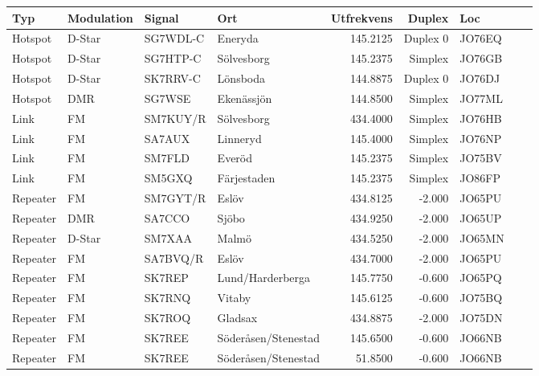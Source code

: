 \begin{longtable}{llllrrlcl}
	Typ      & Modulation      & Signal   & Ort                     & Utfrekvens &   Duplex & Loc    &  &  \\ \hline
	Hotspot  & D-Star          & SG7WDL-C & Eneryda                 &   145.2125 & Duplex 0 & JO76EQ &  \\
	Hotspot  & D-Star          & SG7HTP-C & Sölvesborg              &   145.2375 &  Simplex & JO76GB &  \\
	Hotspot  & D-Star          & SK7RRV-C & Lönsboda                &   144.8875 & Duplex 0 & JO76DJ &  \\
	Hotspot  & DMR             & SG7WSE   & Ekenässjön              &   144.8500 &  Simplex & JO77ML &  \\
	Link     & FM              & SM7KUY/R & Sölvesborg              &   434.4000 &  Simplex & JO76HB &  \\
	Link     & FM              & SA7AUX   & Linneryd                &   145.4000 &  Simplex & JO76NP &  \\
	Link     & FM              & SM7FLD   & Everöd                  &   145.2375 &  Simplex & JO75BV &  \\
	Link     & FM              & SM5GXQ   & Färjestaden             &   145.2375 &  Simplex & JO86FP &  \\
	Repeater & FM              & SM7GYT/R & Eslöv                   &   434.8125 &   -2.000 & JO65PU &  \\
	Repeater & DMR             & SA7CCO   & Sjöbo                   &   434.9250 &   -2.000 & JO65UP &  \\
	Repeater & D-Star          & SM7XAA   & Malmö                   &   434.5250 &   -2.000 & JO65MN &  \\
	Repeater & FM              & SA7BVQ/R & Eslöv                   &   434.7000 &   -2.000 & JO65PU &  \\
	Repeater & FM              & SK7REP   & Lund/Harderberga        &   145.7750 &   -0.600 & JO65PQ &  \\
	Repeater & FM              & SK7RNQ   & Vitaby                  &   145.6125 &   -0.600 & JO75BQ &  \\
	Repeater & FM              & SK7ROQ   & Gladsax                 &   434.8875 &   -2.000 & JO75DN &  \\
	Repeater & FM              & SK7REE   & Söderåsen/Stenestad     &   145.6500 &   -0.600 & JO66NB &  \\
	Repeater & FM              & SK7REE   & Söderåsen/Stenestad     &    51.8500 &   -0.600 & JO66NB &  \\

\end{longtable}
